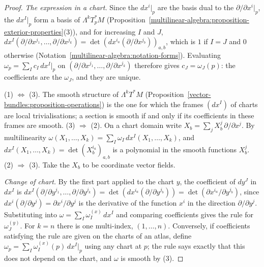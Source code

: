 \begin{proof}
\emph{The expression in a chart.} Since the $dx^i|_p$ are the basis dual to the $\partial/\partial x^i|_p$, the $dx^I|_p$ form a basis of $\Lambda^kT_p^*M$
(Proposition~\ref{multilinear-algebra:proposition-exterior-properties}(3)), and for increasing $I$ and $J$,
$dx^I(\partial/\partial x^{j_1}, \ldots, \partial/\partial x^{j_k}) = \det(dx^{i_a}(\partial/\partial x^{j_b}))_{a,b}$, which is $1$ if $I = J$ and $0$ otherwise
(Notation~\ref{multilinear-algebra:notation-forms}). Evaluating $\omega_p = \sum_Ic_I\,dx^I|_p$ on $(\partial/\partial x^{j_1}, \ldots, \partial/\partial x^{j_k})$ therefore gives
$c_J = \omega_J(p)$: the coefficients are the $\omega_J$, and they are unique.

(1) $\Leftrightarrow$ (3). The smooth structure of $\Lambda^kT^*M$ (Proposition~\ref{vector-bundles:proposition-operations}) is the one for which the frames $(dx^I)$ of charts are
local trivialisations; a section is smooth if and only if its coefficients in these frames are smooth. (3) $\Rightarrow$ (2). On a chart domain write
$X_b = \sum_jX_b^j\,\partial/\partial x^j$. By multilinearity $\omega(X_1, \ldots, X_k) = \sum_I\omega_I\,dx^I(X_1, \ldots, X_k)$, and
$dx^I(X_1, \ldots, X_k) = \det(X_b^{i_a})_{a,b}$ is a polynomial in the smooth functions $X_b^j$. (2) $\Rightarrow$ (3). Take the $X_b$ to be coordinate vector fields.

\emph{Change of chart.} By the first part applied to the chart $y$, the coefficient of $dy^J$ in $dx^I$ is
$dx^I(\partial/\partial y^{j_1}, \ldots, \partial/\partial y^{j_k}) = \det(dx^{i_a}(\partial/\partial y^{j_b})) = \det(\partial x^{i_a}/\partial y^{j_b})$, since
$dx^i(\partial/\partial y^j) = \partial x^i/\partial y^j$ is the derivative of the function $x^i$ in the direction $\partial/\partial y^j$. Substituting into
$\omega = \sum_I\omega^{(x)}_I\,dx^I$ and comparing coefficients gives the rule for $\omega^{(y)}_J$. For $k = n$ there is one multi-index, $(1, \ldots, n)$. Conversely, if
coefficients satisfying the rule are given on the charts of an atlas, define $\omega_p = \sum_I\omega^{(x)}_I(p)\,dx^I|_p$ using any chart at $p$; the rule says exactly
that this does not depend on the chart, and $\omega$ is smooth by (3).
\end{proof}


